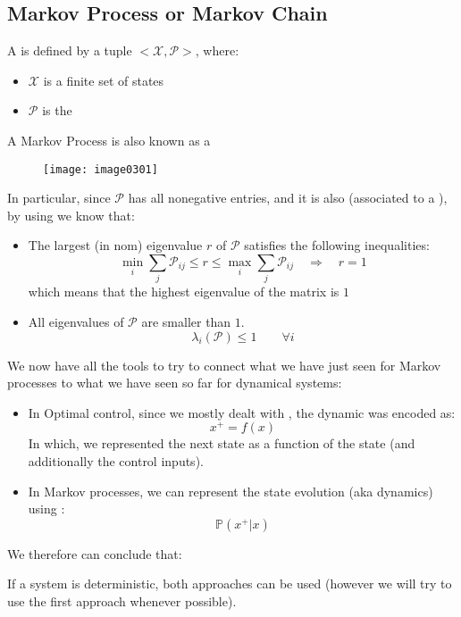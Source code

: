 \subsection{Markov Process or Markov Chain}

A  is defined by a tuple $<\mathcal{X}, \mathcal{P}>$, where:
\begin{itemize}
\item $\mathcal{X}$ is a finite set of states
\item $\mathcal{P}$ is the 
\end{itemize}
A Markov Process is also known as a 

\begin{figure}[!h]
\centering
\texttt{[image: image0301]}
\end{figure}

In particular, since $\mathcal{P}$ has all nonegative entries, and it is also  (associated to a ), by using  we know that:
\begin{itemize}
\item The largest (in nom) eigenvalue $r$ of $\mathcal{P}$ satisfies the following inequalities:
\[\min_i \sum_j \mathcal{P}_{ij}\le r\le\max_i \sum_{j}\mathcal{P}_{ij}\quad\Rightarrow\quad r = 1\]
which means that the highest eigenvalue of the matrix is $1$
\item All eigenvalues of $\mathcal{P}$ are smaller than $1$.
\[\lambda_i(\mathcal{P})\le 1 \qquad \forall i\]
\end{itemize}

We now have all the tools to try to connect what we have just seen for Markov processes to what we have seen so far for dynamical systems:
\begin{itemize}
\item In Optimal control, since we mostly dealt with , the dynamic was encoded as:
\[x^+ = f(x)\]
In which, we represented the next state as a function of the state (and  additionally the control inputs).

\item In Markov processes, we can represent the state evolution (aka dynamics) using :
\[\mathbb{P}(x^+|x)\]
\end{itemize}
We therefore can conclude that: 

If a system is deterministic, both approaches can be used (however we will try to use the first approach whenever possible).

